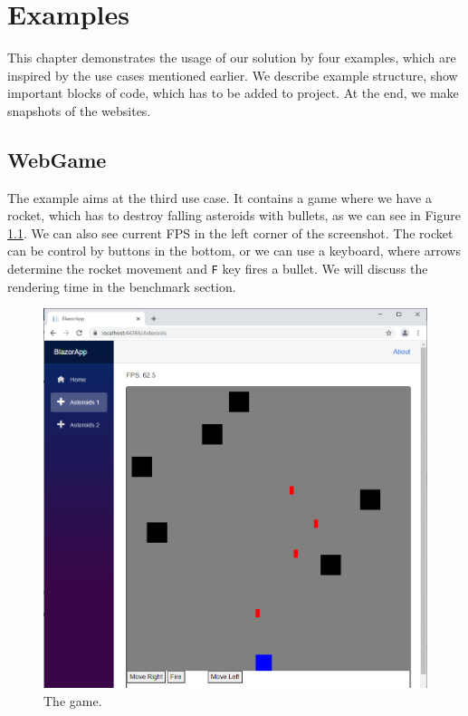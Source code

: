 \chapter{Examples}

This chapter demonstrates the usage of our solution by four examples, which are inspired by the use cases mentioned earlier.
We describe example structure, show important blocks of code, which has to be added to project.
At the end, we make snapshots of the websites.
\par

\section{WebGame}

The example aims at the third use case.
It contains a game where we have a rocket, which has to destroy falling asteroids with bullets, as we can see in Figure \ref{img28:game}.
We can also see current \ac{FPS} in the left corner of the screenshot.
The rocket can be control by buttons in the bottom, or we can use a keyboard, where arrows determine the rocket movement and \texttt{F} key fires a bullet.
We will discuss the rendering time in the benchmark section.
\par
\begin{figure}\centering
\includegraphics[scale=0.5]{./img/Asteroids}
\caption{The game.}
\label{img28:game}
\end{figure} 
